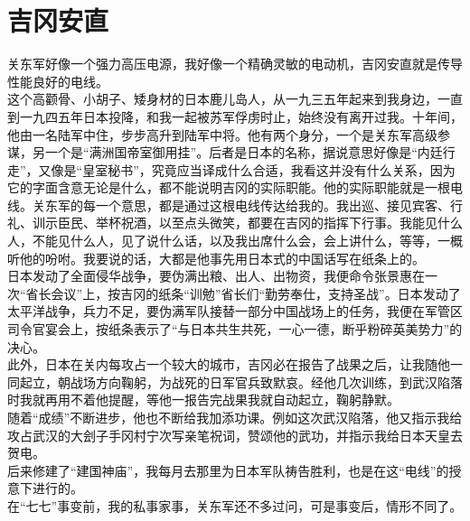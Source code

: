 \fancyhead[RO]{} %
\fancyhead[LE]{} %
\chapter*{吉冈安直}
\thispagestyle{empty}
关东军好像一个强力高压电源，我好像一个精确灵敏的电动机，吉冈安直就是传导性能良好的电线。\\

这个高颧骨、小胡子、矮身材的日本鹿儿岛人，从一九三五年起来到我身边，一直到一九四五年日本投降，和我一起被苏军俘虏时止，始终没有离开过我。十年间，他由一名陆军中住，步步高升到陆军中将。他有两个身分，一个是关东军高级参谋，另一个是“满洲国帝室御用挂”。后者是日本的名称，据说意思好像是“内廷行走”，又像是“皇室秘书”，究竟应当译成什么合适，我看这并没有什么关系，因为它的字面含意无论是什么，都不能说明吉冈的实际职能。他的实际职能就是一根电线。关东军的每一个意思，都是通过这根电线传达给我的。我出巡、接见宾客、行礼、训示臣民、举杯祝酒，以至点头微笑，都要在吉冈的指挥下行事。我能见什么人，不能见什么人，见了说什么话，以及我出席什么会，会上讲什么，等等，一概听他的吩咐。我要说的话，大都是他事先用日本式的中国话写在纸条上的。\\

日本发动了全面侵华战争，要伪满出粮、出人、出物资，我便命令张景惠在一次“省长会议”上，按吉冈的纸条“训勉”省长们“勤劳奉仕，支持圣战”。日本发动了太平洋战争，兵力不足，要伪满军队接替一部分中国战场上的任务，我便在军管区司令官宴会上，按纸条表示了“与日本共生共死，一心一德，断乎粉碎英美势力”的决心。\\

此外，日本在关内每攻占一个较大的城市，吉冈必在报告了战果之后，让我随他一同起立，朝战场方向鞠躬，为战死的日军官兵致默哀。经他几次训练，到武汉陷落时我就再用不着他提醒，等他一报告完战果我就自动起立，鞠躬静默。\\

随着“成绩”不断进步，他也不断给我加添功课。例如这次武汉陷落，他又指示我给攻占武汉的大刽子手冈村宁次写亲笔祝词，赞颂他的武功，并指示我给日本天皇去贺电。\\

后来修建了“建国神庙”，我每月去那里为日本军队祷告胜利，也是在这“电线”的授意下进行的。\\

在“七七”事变前，我的私事家事，关东军还不多过问，可是事变后，情形不同了。\\


